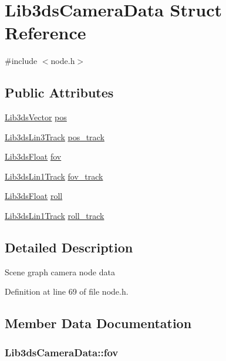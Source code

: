 \hypertarget{struct_lib3ds_camera_data}{\section{Lib3ds\-Camera\-Data Struct Reference}
\label{struct_lib3ds_camera_data}
}


{\ttfamily \#include $<$node.\-h$>$}

\subsection*{Public Attributes}
\begin{DoxyCompactItemize}
\item 
\hyperlink{group__vector_ga6ac1c3b3ef15381ebf6baf264d658dcf}{Lib3ds\-Vector} \hyperlink{struct_lib3ds_camera_data_a16e2b4990180de4516ce0b5b8b5b5bae}{pos}
\item 
\hyperlink{struct_lib3ds_lin3_track}{Lib3ds\-Lin3\-Track} \hyperlink{struct_lib3ds_camera_data_affdd51041472deadbbe0aebf6afa7f0a}{pos\-\_\-track}
\item 
\hyperlink{types_8h_ab18e70f51f9a53c9dee8d930c8e1a7bf}{Lib3ds\-Float} \hyperlink{struct_lib3ds_camera_data_a2ea7b39246cb03b1d0349eb4a6403be2}{fov}
\item 
\hyperlink{struct_lib3ds_lin1_track}{Lib3ds\-Lin1\-Track} \hyperlink{struct_lib3ds_camera_data_a6c8cd4262ace8fee9100e12dfb434e06}{fov\-\_\-track}
\item 
\hyperlink{types_8h_ab18e70f51f9a53c9dee8d930c8e1a7bf}{Lib3ds\-Float} \hyperlink{struct_lib3ds_camera_data_af8ae6d598d353a163e9a3efec30d40b2}{roll}
\item 
\hyperlink{struct_lib3ds_lin1_track}{Lib3ds\-Lin1\-Track} \hyperlink{struct_lib3ds_camera_data_aa280c95e4d40f8235fee0ccb878e82bd}{roll\-\_\-track}
\end{DoxyCompactItemize}


\subsection{Detailed Description}
Scene graph camera node data 

Definition at line 69 of file node.\-h.



\subsection{Member Data Documentation}
\hypertarget{struct_lib3ds_camera_data_a2ea7b39246cb03b1d0349eb4a6403be2}{
\subsubsection[{fov}]{ Lib3ds\-Camera\-Data\-::fov}}\label{struct_lib3ds_camera_data_a2ea7b39246cb03b1d0349eb4a6403be2}


